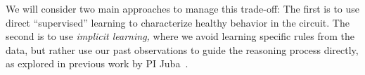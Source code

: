 \documentclass[12pt]{article}
\newcommand{\note}[1]{\textbf{\textit{#1}}}
\begin{document}
We will consider two main approaches to manage this trade-off: The first is to use direct ``supervised'' learning to characterize healthy behavior in the circuit. The second is to use {\em implicit learning,} where we avoid learning specific rules from the data, but rather use our past observations to guide the reasoning process directly, as explored in previous work by PI Juba~\cite{juba2013ijcai}.


\end{document}
